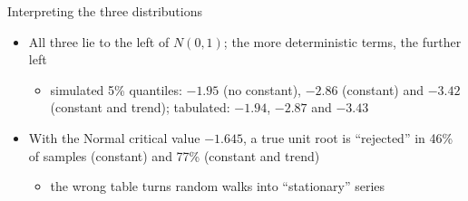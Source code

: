 \begin{frame}{Interpreting the three distributions}
\itemsize{\small}
\begin{itemize}
    \item All three lie to the left of $N(0, 1)$; the more deterministic terms, the further left
    \begin{itemize}
        \item simulated 5\% quantiles: $\ensuremath{-}1.95$ (no constant), $\ensuremath{-}2.86$ (constant) and $\ensuremath{-}3.42$ (constant and trend); tabulated: $\ensuremath{-}1.94$, $\ensuremath{-}2.87$ and $\ensuremath{-}3.43$
    \end{itemize}
    \item With the Normal critical value $-1.645$, a true unit root is ``rejected'' in 46\% of samples (constant) and 77\% (constant and trend)
    \begin{itemize}
        \item the wrong table turns random walks into ``stationary'' series
    \end{itemize}
\end{itemize}
\end{frame}

